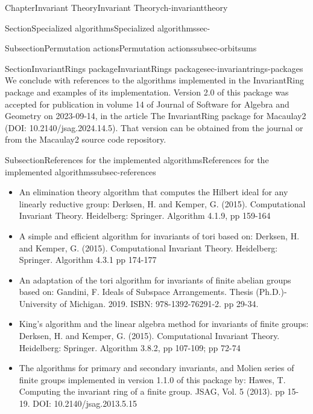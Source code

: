 \documentclass[oneside,10pt,]{book}
\begin{document}
\begin{chapterptx}{Chapter}{Invariant Theory}{}{Invariant Theory}{}{}{ch-invarianttheory}
\begin{sectionptx}{Section}{Specialized algorithms}{}{Specialized algorithms}{}{}{sec-}
\begin{subsectionptx}{Subsection}{Permutation actions}{}{Permutation actions}{}{}{subsec-orbitsums}
\end{subsectionptx}
\end{sectionptx}
%
%
\typeout{************************************************}
\typeout{************************************************}
%
\begin{sectionptx}{Section}{InvariantRings package}{}{InvariantRings package}{}{}{sec-invariantrings-packages}
We conclude with references to the algorithms implemented in the InvariantRing package and examples of its implementation. Version 2.0 of this package was accepted for publication in volume 14 of Journal of Software for Algebra and Geometry on 2023-09-14, in the article The InvariantRing package for Macaulay2 (DOI: 10.2140\slash{}jsag.2024.14.5). That version can be obtained from the journal or from the Macaulay2 source code repository.%
%
%
\typeout{************************************************}
\typeout{************************************************}
%
\begin{subsectionptx}{Subsection}{References for the implemented algorithms}{}{References for the implemented algorithms}{}{}{subsec-references}
%
\begin{itemize}[label=\textbullet]
\item{}An elimination theory algorithm that computes the Hilbert ideal for any linearly reductive group: Derksen, H. and Kemper, G. (2015). Computational Invariant Theory. Heidelberg: Springer. Algorithm 4.1.9, pp 159-164%
\item{}A simple and efficient algorithm for invariants of tori based on: Derksen, H. and Kemper, G. (2015). Computational Invariant Theory. Heidelberg: Springer. Algorithm 4.3.1 pp 174-177%
\item{}An adaptation of the tori algorithm for invariants of finite abelian groups based on: Gandini, F. Ideals of Subspace Arrangements. Thesis (Ph.D.)-University of Michigan. 2019. ISBN: 978-1392-76291-2. pp 29-34.%
\item{}King's algorithm and the linear algebra method for invariants of finite groups: Derksen, H. and Kemper, G. (2015). Computational Invariant Theory. Heidelberg: Springer. Algorithm 3.8.2, pp 107-109; pp 72-74%
\item{}The algorithms for primary and secondary invariants, and Molien series of finite groups implemented in version 1.1.0 of this package by: Hawes, T. Computing the invariant ring of a finite group. JSAG, Vol. 5 (2013). pp 15-19. DOI: 10.2140\slash{}jsag.2013.5.15%

\end{itemize}
\end{subsectionptx}
\end{sectionptx}
\end{chapterptx}
\end{document}
